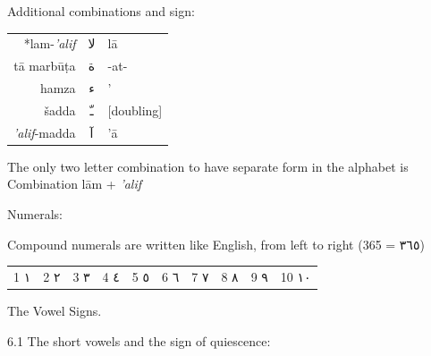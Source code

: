 \documentclass{article}
\newcommand{\ar}[1]{{\arabicfont #1}}
\newcommand{\cursive}[1]{{\cursivefont #1}}
\begin{document}
\begin{center}

\cursive{\Large Additional combinations and sign:}

\vspace{1em}

\begin{tabular}{r c l}
\\
*lam-\textit{'alif}    & \ar{لا} & l\={a}       \\[6pt]
t\={a} marb\={u}\d{t}a & \ar{ة}  & -at-         \\[6pt]
hamza                  & \ar{ء}  & '            \\[6pt]
\v{s}adda              & \ar{ـّ} & {[doubling]} \\[6pt]
\textit{'alif}-madda   & \ar{آ}  & '\={a}       \\[6pt]
\end{tabular}

\vspace{2em}

The only two letter combination to have separate form in the alphabet is\\
Combination l\={a}m + \textit{'alif}

\vspace{3em}

\cursive{\Large Numerals:}

\vspace{1em}

Compound numerals are written like English, from left to right (365 = \ar{٣٦٥})

\vspace{1em}

\begin{tabular}{c c c c c c c c c c}
1 \ar{١} & 2 \ar{٢} & 3 \ar{٣} & 4 \ar{٤} & 5 \ar{٥} &
6 \ar{٦} & 7 \ar{٧} & 8 \ar{٨} & 9 \ar{٩} & 10 \ar{١٠} \\
\end{tabular}

\end{center}

\newpage

\begin{center}
{\Large The Vowel Signs.}

\vspace{0.5em}

6.1 The short vowels and the sign of quiescence:
\end{center}

\vspace{1em}
\end{document}
